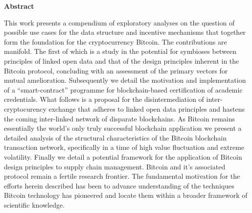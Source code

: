 \thispagestyle{empty}
\vspace*{1.0cm}

\begin{center}
    \textbf{Abstract}
\end{center}

\vspace*{0.5cm}

\noindent

This work presents a compendium of exploratory analyses on the question of possible use cases for the data structure and incentive mechanisms that together form the foundation for the cryptocurrency Bitcoin. 
The contributions are manifold. 
The first of which is a study in the potential for symbioses between principles of linked open data and that of the design principles inherent in the Bitcoin protocol, concluding with an assessment of the primary vectors for mutual amelioration.
Subsequently we detail the motivation and implementation of a ``smart-contract'' programme for blockchain-based certification of academic credentials.
What follows is a proposal for the disintermediation of inter-cryptocurency exchange that adheres to linked open data principles and hastens the coming inter-linked network of disparate blockchains. 
As Bitcoin remains essentially the world's only truly successful blockchain application we present a detailed analysis of the structural characteristics of the Bitcoin blockchain transaction network, specifically in a time of high value fluctuation and extreme volatility. 
Finally we detail a potential framework for the application of Bitcoin design principles to supply chain management. 
Bitcoin and it's associated protocol remain a fertile research frontier. 
The fundamental motivation for the efforts herein described has been to advance understanding of the techniques Bitcoin technology has pioneered and locate them within a broader framework of scientific knowledge.